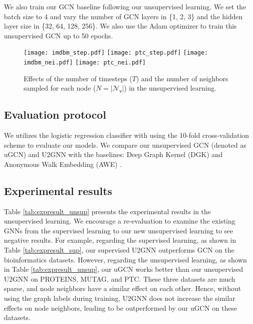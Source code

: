 \documentclass[twoside,leqno,twocolumn]{article}
\newcommand{\citep}{\cite}
\begin{document}
We also train our GCN baseline following our unsupervised learning.
We set the batch size to 4 and vary the number of GCN layers in \{1, 2, 3\} and the hidden layer size in \{32, 64, 128, 256\}. We also use the Adam optimizer \citep{kingma2014adam} to train this unsupervised GCN up to 50 epochs.


\begin{figure*}[ht]
\centering
    \texttt{[image: imdbm\_step.pdf]}
    \texttt{[image: ptc\_step.pdf]}
    \texttt{[image: imdbm\_nei.pdf]}
    \texttt{[image: ptc\_nei.pdf]}
\caption[short]{Effects of the number of timesteps ($T$) and the number of neighbors sampled for each node ($N=|\mathcal{N}_\mathsf{v}|$) in the unsupervised learning.}
\label{fig:hypereffectNT}
\end{figure*}


\subsection{Evaluation protocol} 
We utilizes the logistic regression classifier \citep{Fan:2008} with using the 10-fold cross-validation scheme to evaluate our models.
We compare our unsupervised GCN (denoted as uGCN) and U2GNN with the baselines: Deep Graph Kernel (DGK) \citep{yanardag2015deep} and Anonymous Walk Embedding (AWE) \citep{ivanov2018anonymous}.

\subsection{Experimental results}
\label{subsec:unsupresults}

Table \ref{tab:expresult_unsup} presents the experimental results in the unsupervised learning.
We encourage a re-evaluation to examine the existing GNNs from the supervised learning to our new unsupervised learning to see negative results.
For example, regarding the supervised learning, as shown in Table \ref{tab:expresult_sup}, our supervised U2GNN outperforms GCN on the bioinformatics datasets.
However, regarding the unsupervised learning, as shown in Table \ref{tab:expresult_unsup}, our uGCN works better than our unsupervised U2GNN on PROTEINS, MUTAG, and PTC.
These three datasets are much sparse, and node neighbors have a similar effect on each other. 
Hence, without using the graph labels during training, U2GNN does not increase the similar effects on node neighbors, leading to be outperformed by our uGCN on these datasets.
\end{document}
